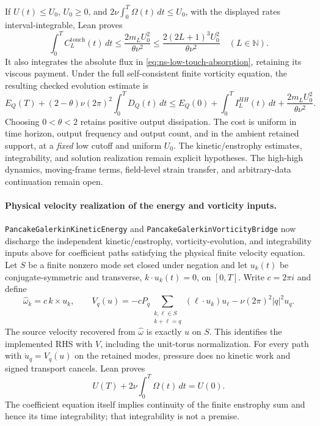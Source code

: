 \documentclass[11pt]{article}
\theoremstyle{definition}
\begin{document}
If $U(t)\le U_0$, $U_0\ge0$, and
$2\nu\int_0^T\Omega(t)\,dt\le U_0$, with the displayed rates
interval-integrable, Lean proves
\begin{equation}\label{eq:ns-low-touch-time-cost}
 \int_0^T C_L^{\mathrm{touch}}(t)\,dt
 \le\frac{2m_LU_0^2}{\theta\nu^2}
 \le\frac{2(2L+1)^3U_0^2}{\theta\nu^2}
 \quad(L\in\mathbb N).
\end{equation}
It also integrates the absolute flux in
\eqref{eq:ns-low-touch-absorption}, retaining its viscous payment.
Under the full self-consistent finite vorticity equation, the resulting
checked evolution estimate is
\begin{equation}\label{eq:ns-high-high-remainder}
 E_Q(T)+(2-\theta)\nu(2\pi)^2\int_0^T D_Q(t)\,dt
 \le E_Q(0)+\int_0^T I_L^{HH}(t)\,dt
      +\frac{2m_LU_0^2}{\theta\nu^2}.
\end{equation}
Choosing $0<\theta<2$ retains positive output dissipation.  The cost
is uniform in time horizon, output frequency and output count, and in the
ambient retained support, at a \emph{fixed} low cutoff and uniform $U_0$.
The kinetic/enstrophy estimates, integrability, and solution realization
remain explicit hypotheses.  The high-high dynamics, moving-frame terms,
field-level strain transfer, and arbitrary-data continuation remain open.

\paragraph{Physical velocity realization of the energy and vorticity inputs.}
\texttt{PancakeGalerkinKineticEnergy} and
\texttt{PancakeGalerkinVorticityBridge} now discharge the independent
kinetic/enstrophy, vorticity-evolution, and integrability inputs above for
coefficient paths satisfying the physical finite velocity equation.
Let $S$ be a finite nonzero mode set closed under negation and let
$u_k(t)$ be conjugate-symmetric and transverse, $k\cdot u_k(t)=0$,
on $[0,T]$.  Write $c=2\pi i$ and define
\[
 \widehat\omega_k=c\,k\times u_k,\qquad
 V_q(u)=-c P_q\!\sum_{\substack{k,\ell\in S\\ k+\ell=q}}
              (\ell\cdot u_k)u_\ell
             -\nu(2\pi)^2|q|^2u_q.
\]
The source velocity recovered from $\widehat\omega$ is exactly $u$ on
$S$.  This identifies the implemented RHS with $V$, including the
unit-torus normalization.  For every path with $\dot u_q=V_q(u)$ on
the retained modes, pressure does no kinetic work and signed transport
cancels.  Lean proves
\begin{equation}\label{eq:ns-galerkin-kinetic-identity}
 U(T)+2\nu\int_0^T\Omega(t)\,dt=U(0).
\end{equation}
The coefficient equation itself implies continuity of the finite enstrophy
sum and hence its time integrability; that integrability is not a premise.
\end{document}
